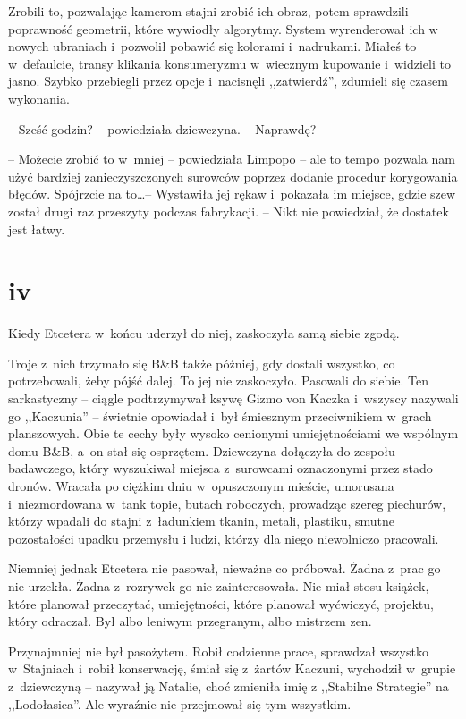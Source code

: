 \documentclass[oneside,polish,11pt,sfheadings]{mwbk}
\begin{document}
Zrobili to, pozwalając kamerom stajni zrobić ich obraz, potem sprawdzili
poprawność geometrii, które wywiodły algorytmy. System wyrenderował ich
w nowych ubraniach i~pozwolił pobawić się kolorami i~nadrukami. Miałeś
to w~defaulcie, transy klikania konsumeryzmu w~wiecznym kupowanie i~widzieli to jasno. Szybko przebiegli przez opcje i~nacisnęli
,,zatwierdź'', zdumieli się czasem wykonania.

-- Sześć godzin? -- powiedziała dziewczyna. -- Naprawdę?

-- Możecie zrobić to w~mniej -- powiedziała Limpopo -- ale to tempo pozwala
nam użyć bardziej zanieczyszczonych surowców poprzez dodanie procedur
korygowania błędów. Spójrzcie na to\ldots  -- Wystawiła jej rękaw i~pokazała
im miejsce, gdzie szew został drugi raz przeszyty podczas fabrykacji. -- Nikt nie powiedział, że dostatek jest łatwy.

\chapter*{iv}

Kiedy Etcetera w~końcu uderzył do niej, zaskoczyła samą siebie zgodą.

Troje z~nich trzymało się B\&B także później, gdy dostali wszystko, co
potrzebowali, żeby pójść dalej. To jej nie zaskoczyło. Pasowali do
siebie. Ten sarkastyczny -- ciągle podtrzymywał ksywę Gizmo von Kaczka i~wszyscy nazywali go ,,Kaczunia'' -- świetnie opowiadał i~był śmiesznym
przeciwnikiem w~grach planszowych. Obie te cechy były wysoko cenionymi
umiejętnościami we wspólnym domu B\&B, a~on stał się osprzętem.
Dziewczyna dołączyła do zespołu badawczego, który wyszukiwał miejsca z~surowcami oznaczonymi przez stado dronów. Wracała po ciężkim dniu w~opuszczonym mieście, umorusana i~niezmordowana w~tank topie, butach
roboczych, prowadząc szereg piechurów, którzy wpadali do stajni z~ładunkiem tkanin, metali, plastiku, smutne pozostałości upadku przemysłu
i ludzi, którzy dla niego niewolniczo pracowali.

Niemniej jednak Etcetera nie pasował, nieważne co próbował. Żadna z~prac
go nie urzekła. Żadna z~rozrywek go nie zainteresowała. Nie miał stosu
książek, które planował przeczytać, umiejętności, które planował
wyćwiczyć, projektu, który odraczał. Był albo leniwym przegranym, albo
mistrzem zen.

Przynajmniej nie był pasożytem. Robił codzienne prace, sprawdzał
wszystko w~Stajniach i~robił konserwację, śmiał się z~żartów Kaczuni,
wychodził w~grupie z~dziewczyną -- nazywał ją Natalie, choć zmieniła imię
z ,,Stabilne Strategie'' na ,,Lodołasica''. Ale wyraźnie nie przejmował
się tym wszystkim.
\end{document}
